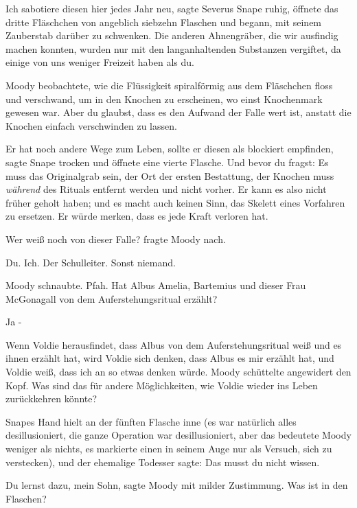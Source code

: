 \glqq{}Ich sabotiere diesen hier jedes Jahr neu\grqq{}, sagte Severus Snape
ruhig, öffnete das dritte Fläschchen von angeblich siebzehn Flaschen und begann,
mit seinem Zauberstab darüber zu schwenken. \glqq{}Die anderen Ahnengräber, die
wir ausfindig machen konnten, wurden nur mit den langanhaltenden Substanzen
vergiftet, da einige von uns weniger Freizeit haben als du.\grqq{}

Moody beobachtete, wie die Flüssigkeit spiralförmig aus dem Fläschchen floss und
verschwand, um in den Knochen zu erscheinen, wo einst Knochenmark gewesen war.
\glqq{}Aber du glaubst, dass es den Aufwand der Falle wert ist, anstatt die
Knochen einfach verschwinden zu lassen.\grqq{}

\glqq{}Er hat noch andere Wege zum Leben, sollte er diesen als blockiert
empfinden\grqq{}, sagte Snape trocken und öffnete eine vierte Flasche. \glqq{}Und
bevor du fragst: Es muss das Originalgrab sein, der Ort der ersten Bestattung,
der Knochen muss \emph{während} des Rituals entfernt werden und nicht vorher. Er
kann es also nicht früher geholt haben; und es macht auch keinen Sinn, das
Skelett eines Vorfahren zu ersetzen. Er würde merken, dass es jede Kraft
verloren hat.\grqq{}

\glqq{}Wer weiß noch von dieser Falle?\grqq{} fragte Moody nach.

\glqq{}Du. Ich. Der Schulleiter. Sonst niemand.\grqq{}

Moody schnaubte. \glqq{}Pfah. Hat Albus Amelia, Bartemius und dieser Frau
McGonagall von dem Auferstehungsritual erzählt?\grqq{}

\glqq{}Ja -\grqq{}

\glqq{}Wenn Voldie herausfindet, dass Albus von dem Auferstehungsritual weiß und
es ihnen erzählt hat, wird Voldie sich denken, dass Albus es mir erzählt hat,
und Voldie weiß, dass ich an so etwas denken würde.\grqq{} Moody schüttelte
angewidert den Kopf. \glqq{}Was sind das für andere Möglichkeiten, wie Voldie
wieder ins Leben zurückkehren könnte?\grqq{}

Snapes Hand hielt an der fünften Flasche inne (es war natürlich alles
desillusioniert, die ganze Operation war desillusioniert, aber das bedeutete
Moody weniger als nichts, es markierte einen in seinem Auge nur als Versuch,
sich zu verstecken), und der ehemalige Todesser sagte: \glqq{}Das musst du nicht
wissen.\grqq{}

\glqq{}Du lernst dazu, mein Sohn\grqq{}, sagte Moody mit milder Zustimmung. \glqq
Was ist in den Flaschen?\grqq{}

